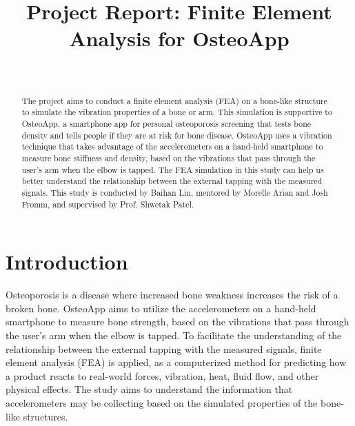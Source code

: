 \documentclass{sigchi}
\begin{document}
\title{Project Report: Finite Element Analysis for OsteoApp}

\author{%
  \\
}

\maketitle

\begin{abstract}
The project aims to conduct a finite element analysis (FEA) on a bone-like structure to simulate the vibration properties of a bone or arm. This simulation is supportive to OsteoApp, a smartphone app for personal osteoporosis screening that tests bone density and tells people if they are at risk for bone disease. OsteoApp uses a vibration technique that takes advantage of the accelerometers on a hand-held smartphone to measure bone stiffness and density, based on the vibrations that pass through the user's arm when the elbow is tapped. The FEA simulation in this study can help us better understand the relationship between the external tapping with the measured signals. This study is conducted by Baihan Lin, mentored by Morelle Arian and Josh Fromm, and supervised by Prof. Shwetak Patel.

\end{abstract}



\section{Introduction}

Osteoporosis is a disease where increased bone weakness increases the risk of a broken bone. OsteoApp aims to utilize the accelerometers on a hand-held smartphone to measure bone strength, based on the vibrations that pass through the user's arm when the elbow is tapped. To facilitate the understanding of the relationship between the external tapping with the measured signals, finite element analysis (FEA) is applied, as a computerized method for predicting how a product reacts to real-world forces, vibration, heat, fluid flow, and other physical effects. The study aims to understand the information that accelerometers may be collecting based on the simulated properties of the bone-like structures. \\
\end{document}

